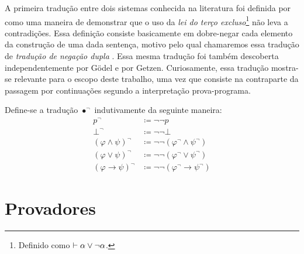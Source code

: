 A primeira tradução entre dois sistemas conhecida na literatura foi definida por~\cite{Kolmogorov} como uma maneira de demonstrar que o uso da \emph{lei do terço excluso}\footnote{Definido como $\mathrel{\vdash}\alpha\vee\neg\alpha$.} não leva a contradições. Essa definição consiste basicamente em dobre-negar cada elemento da construção de uma dada sentença, motivo pelo qual chamaremos essa tradução de \emph{tradução de negação dupla} \citep{Coniglio}. Essa mesma tradução foi também descoberta independentemente por Gödel e por Getzen. Curiosamente, essa tradução mostra-se relevante para o escopo deste trabalho, uma vez que consiste na contraparte da passagem por continuações segundo a interpretação prova-programa.

\begin{definition}[$\bullet^\neg$] Define-se a tradução $\bullet^\neg$ indutivamente da seguinte maneira:
    \begin{align*}
        p^\neg&\coloneqq\neg\neg p\\
        \bot^\neg&\coloneqq\neg\neg\bot\\
        {(\varphi\wedge\psi)}^\neg&\coloneqq\neg\neg(\varphi^\neg \wedge \psi^\neg)\\
        {(\varphi\vee\psi)}^\neg&\coloneqq\neg\neg (\varphi^\neg \vee \psi^\neg)\\
        {(\varphi\to\psi)}^\neg&\coloneqq\neg\neg (\varphi^\neg \to \psi^\neg)
        \tag*{\qed} 
    \end{align*}
\end{definition}

\section{Provadores}
